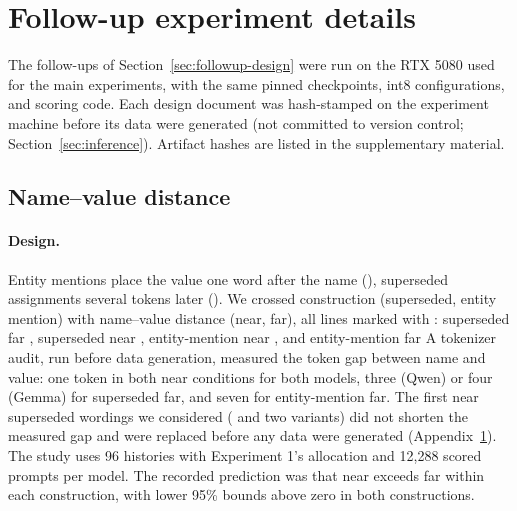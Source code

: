 \section{Follow-up experiment details}
\label{app:followups}

The follow-ups of Section~\ref{sec:followup-design} were run on the RTX 5080 used for the main experiments, with the same pinned checkpoints, int8 configurations, and scoring code. Each design document was hash-stamped on the experiment machine before its data were generated (not committed to version control; Section~\ref{sec:inference}). Artifact hashes are listed in the supplementary material.

\subsection{Name--value distance}

\paragraph{Design.} Entity mentions place the value one word after the name (), superseded assignments several tokens later (). We crossed construction (superseded, entity mention) with name--value distance (near, far), all lines marked with : superseded far , superseded near , entity-mention near , and entity-mention far  A tokenizer audit, run before data generation, measured the token gap between name and value: one token in both near conditions for both models, three (Qwen) or four (Gemma) for superseded far, and seven for entity-mention far. The first near superseded wordings we considered ( and two variants) did not shorten the measured gap and were replaced before any data were generated (Appendix~\ref{app:followups}). The study uses 96 histories with Experiment 1's allocation and 12,288 scored prompts per model. The recorded prediction was that near exceeds far within each construction, with lower 95\% bounds above zero in both constructions.

